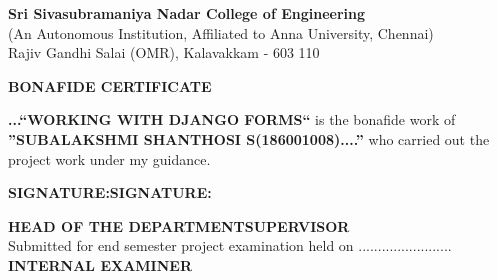 \begin{center}
\thispagestyle{empty}
\vspace{10cm}
\LARGE{\textbf{Sri Sivasubramaniya Nadar College of Engineering }} \\ 
\normalsize{(An Autonomous Institution, Affiliated to Anna University, Chennai)} \\
Rajiv Gandhi Salai (OMR), Kalavakkam - 603 110 \\
\vspace{2cm}

{\Huge \textbf{BONAFIDE CERTIFICATE }}\\[0.5cm]
\end{center}
\linespread{1.13}
\large{
\textbf{...{``WORKING WITH DJANGO FORMS``}} \space is \space the \space bonafide \space work \space of \space \textbf{''SUBALAKSHMI SHANTHOSI S(186001008)....''} \space who carried out the project work under my
guidance. }\\[0.2cm]
\begin{spacing}{0}
\vspace{3.0cm}
\large{\textbf{SIGNATURE:}}\hspace*{2.5in}\large{\textbf{SIGNATURE:}}\\
\vspace*{1,5cm}

\hspace*{0.02in}\textbf{HEAD OF THE DEPARTMENT}\hspace*{0.85in}\textbf{SUPERVISOR}\\[2cm]
\vspace*{1,4cm}
Submitted for end semester project examination held on ........................\\[8cm]

\textbf{INTERNAL EXAMINER }
\end{spacing}
